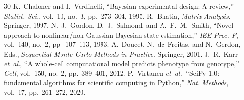 \documentclass[journal]{IEEEtran}
\begin{document}
\begin{thebibliography}{30}
 K.~Chaloner and I.~Verdinelli, ``Bayesian experimental design: A review,'' \emph{Statist. Sci.}, vol.~10, no.~3, pp.~273--304, 1995.
 R.~Bhatia, \emph{Matrix Analysis}. Springer, 1997.
 N.~J.~Gordon, D.~J.~Salmond, and A.~F.~M.~Smith, ``Novel approach to nonlinear/non-Gaussian Bayesian state estimation,'' \emph{IEE Proc. F}, vol.~140, no.~2, pp.~107--113, 1993.
 A.~Doucet, N.~de~Freitas, and N.~Gordon, Eds., \emph{Sequential Monte Carlo Methods in Practice}. Springer, 2001.
 J.~R.~Karr \emph{et~al.}, ``A whole-cell computational model predicts phenotype from genotype,'' \emph{Cell}, vol.~150, no.~2, pp.~389--401, 2012.
 P.~Virtanen \emph{et~al.}, ``SciPy 1.0: fundamental algorithms for scientific computing in Python,'' \emph{Nat. Methods}, vol.~17, pp.~261--272, 2020.
\end{thebibliography}
\end{document}
